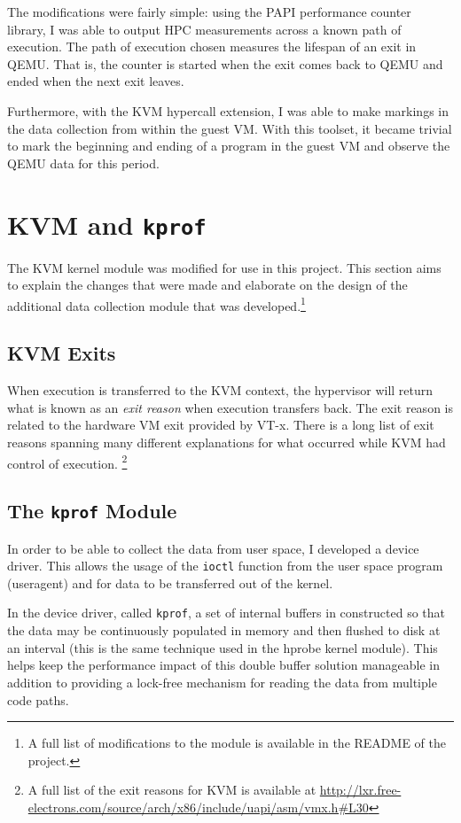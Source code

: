 \documentclass[notitlepage]{article}
\begin{document}
The modifications were fairly simple: using the PAPI performance counter
library, I was able to output HPC measurements across a known path of execution.
The path of execution chosen measures the lifespan of an exit in QEMU. That is,
the counter is started when the exit comes back to QEMU and ended when the next
exit leaves.

Furthermore, with the KVM hypercall extension, I was able to make markings in
the data collection from within the guest VM. With this toolset, it became
trivial to mark the beginning and ending of a program in the guest VM and
observe the QEMU data for this period.


\section{KVM and \texttt{kprof}}
\label{sec:kvm}
The KVM kernel module was modified for use in this project. This section aims to
explain the changes that were made and elaborate on the design of the additional
data collection module that was developed.\footnote{A full list of modifications
to the module is available in the README of the project.}

\subsection{KVM Exits}
When execution is transferred to the KVM context, the hypervisor will return
what is known as an \textit{exit reason} when execution transfers back. The exit
reason is related to the hardware VM exit provided by VT-x. There is
a long list of exit reasons spanning many different explanations for what
occurred while KVM had control of execution. \footnote{A full list of the exit
    reasons for KVM is available at
\url{http://lxr.free-electrons.com/source/arch/x86/include/uapi/asm/vmx.h\#L30}}

\subsection{The \texttt{kprof} Module}
In order to be able to collect the data from user space, I developed a device
driver. This allows the usage of the \texttt{ioctl} function from the user space
program (useragent) and for data to be transferred out of the kernel.

In the device driver, called \texttt{kprof}, a set of internal buffers in
constructed so that the data may be continuously populated in memory and then
flushed to disk at an interval (this is the same technique used in the hprobe
kernel module).  This helps keep the performance impact of this double buffer
solution manageable in addition to providing a lock-free mechanism for reading
the data from multiple code paths.
\end{document}
